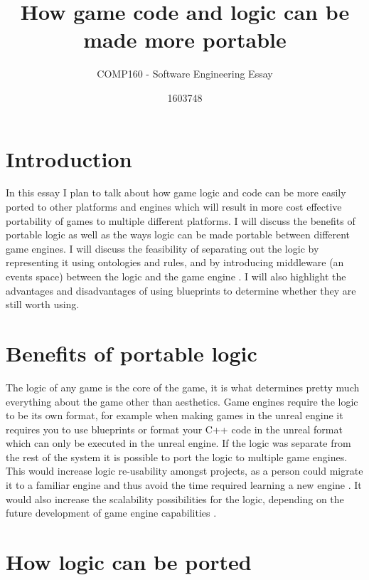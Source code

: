 \documentclass{scrartcl}
\title{How game code and logic can be made more portable}
\subtitle{COMP160 - Software Engineering Essay}
\author{1603748}
\begin{document}
\maketitle


\section{Introduction}
 
In this essay I plan to talk about how game logic and code can be more easily ported to other platforms and engines which will result in more cost effective portability of games to multiple different platforms. I will discuss the benefits of portable logic as well as the ways logic can be made portable between different game engines. I will discuss the feasibility of separating out the logic by representing it using ontologies and rules, and by introducing middleware (an events space) between the logic and the game engine \cite{GameLogic}. I will also highlight the advantages and disadvantages of using blueprints to determine whether they are still worth using.  

\section{Benefits of portable logic}

The logic of any game is the core of the game, it is what determines pretty much everything about the game other than aesthetics. Game engines require the logic to be its own format, for example when making games in the unreal engine it requires you to use blueprints or format your C++ code in the unreal format which can only be executed in the unreal engine. If the logic was separate from the rest of the system it is possible to port the logic to multiple game engines. This would increase logic re-usability amongst projects, as a person could migrate it to a familiar engine and thus avoid the time required learning a new engine \cite{GameLogic}. It would also increase the scalability possibilities for the logic, depending on the future development of game engine capabilities \cite{GameLogic}.

\section{How logic can be ported}
\end{document}
